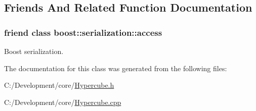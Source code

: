 \subsection{Friends And Related Function Documentation}
\hypertarget{class_go_s_u_m_1_1_c_d_sample_h_c_ac98d07dd8f7b70e16ccb9a01abf56b9c}{
\subsubsection[{boost\-::serialization\-::access}]{\setlength{\rightskip}{0pt plus 5cm}friend class boost\-::serialization\-::access\hspace{0.3cm}{\ttfamily [friend]}}}\label{class_go_s_u_m_1_1_c_d_sample_h_c_ac98d07dd8f7b70e16ccb9a01abf56b9c}


Boost serialization. 



The documentation for this class was generated from the following files\-:\begin{DoxyCompactItemize}
\item 
C\-:/\-Development/core/\hyperlink{_hypercube_8h}{Hypercube.\-h}\item 
C\-:/\-Development/core/\hyperlink{_hypercube_8cpp}{Hypercube.\-cpp}\end{DoxyCompactItemize}
